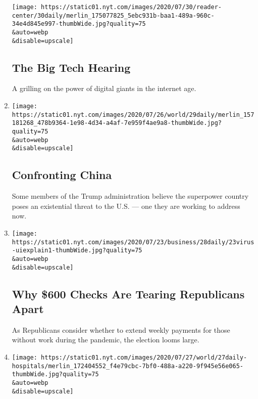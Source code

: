 \begin{enumerate}
  \texttt{[image: https://static01.nyt.com/images/2020/07/30/reader-center/30daily/merlin\_175077825\_5ebc931b-baa1-489a-960c-34e4d845e997-thumbWide.jpg?quality=75\\\&auto=webp\\\&disable=upscale]}

  \hypertarget{the-big-tech-hearing}{%
  \subsection{The Big Tech Hearing}\label{the-big-tech-hearing}}

  A grilling on the power of digital giants in the internet age.
\item
  \href{/2020/07/29/podcasts/the-daily/china-trump-foreign-policy.html}{}

  \texttt{[image: https://static01.nyt.com/images/2020/07/26/world/29daily/merlin\_157181268\_478b9364-1e98-4d34-a4af-7e959f4ae9a8-thumbWide.jpg?quality=75\\\&auto=webp\\\&disable=upscale]}

  \hypertarget{confronting-china}{%
  \subsection{Confronting China}\label{confronting-china}}

  Some members of the Trump administration believe the superpower
  country poses an existential threat to the U.S. --- one they are
  working to address now.
\item
  \href{/2020/07/28/podcasts/the-daily/unemployment-benefits-coronavirus.html}{}

  \texttt{[image: https://static01.nyt.com/images/2020/07/23/business/28daily/23virus-uiexplain1-thumbWide.jpg?quality=75\\\&auto=webp\\\&disable=upscale]}

  \hypertarget{why-600-checks-are-tearing-republicans-apart}{%
  \subsection{Why \$600 Checks Are Tearing Republicans
  Apart}\label{why-600-checks-are-tearing-republicans-apart}}

  As Republicans consider whether to extend weekly payments for those
  without work during the pandemic, the election looms large.
\item
  \href{/2020/07/27/podcasts/the-daily/new-york-hospitals-covid.html}{}

  \texttt{[image: https://static01.nyt.com/images/2020/07/27/world/27daily-hospitals/merlin\_172404552\_f4e79cbc-7bf0-488a-a220-9f945e56e065-thumbWide.jpg?quality=75\\\&auto=webp\\\&disable=upscale]}


\end{enumerate}

